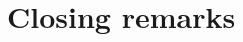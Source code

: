 \documentclass[11pt, twoside]{report}
\begin{document}








\chapter{Closing remarks}
\end{document}
